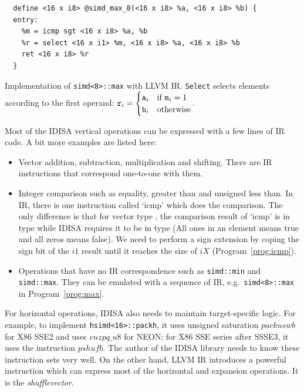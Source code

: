 \begin{program}
\begin{verbatim}
  define <16 x i8> @simd_max_8(<16 x i8> %a, <16 x i8> %b) {
  entry:
    %m = icmp sgt <16 x i8> %a, %b
    %r = select <16 x i1> %m, <16 x i8> %a, <16 x i8> %b
    ret <16 x i8> %r
  }
\end{verbatim}
\caption[Implementation of {\tt simd<8>::max} with LLVM IR]{Implementation of {\tt simd<8>::max} with LLVM IR. {\tt Select} selects elements according to the first operand: $\text{\tt r}_i=
\begin{cases}
    \text{\tt a}_i& \text{if } \text{\tt m}_i = 1\\
    \text{\tt b}_i& \text{otherwise}
\end{cases}$.}
\label{prog:max}
\end{program}

Most of the IDISA vertical operations can be expressed with a few lines of IR code. A bit more examples are listed here:

\begin{itemize}
    \item Vector addition, subtraction, multiplication and shifting. There are IR instructions that correspond one-to-one with them.
    \item Integer comparison such as equality, greater than and unsigned less than. In IR, there is one instruction called `icmp' which does the comparison. The only difference is that for vector type {\tt <N x iX>}, the comparison result of `icmp' is in type {\tt <N x i1>} while IDISA requires it to be in type {\tt <N x iX>} (All ones in an element means true and all zeros means false). We need to perform a sign extension by coping the sign bit of the $i1$ result until it reaches the size of $iX$ (Program~\ref{prog:icmp}).
    \item Operations that have no IR correspondence such as {\tt simd::min} and {\tt simd::max}. They can be emulated with a sequence of IR, e.g.\ {\tt simd<8>::max} in Program~\ref{prog:max}.
\end{itemize}

For horizontal operations, IDISA also needs to maintain target-specific logic. For example, to implement {\tt hsimd<16>::packh}, it uses unsigned saturation $packuswb$ for X86 SSE2 and uses $vuzpq\_u8$ for NEON; for X86 SSE series after SSSE3, it uses the instruction $pshufb$. The author of the IDISA library needs to know these instruction sets very well. On the other hand, LLVM IR introduces a powerful instruction which can express most of the horizontal and expansion operations. It is the \textit{shufflevector}.

